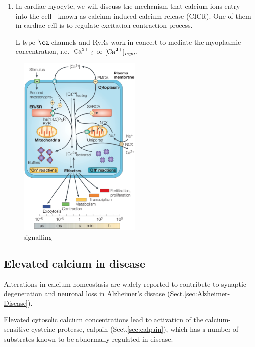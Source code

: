 \begin{enumerate}

  \item  In cardiac myocyte, we will discuss the mechanism that calcium ions
  entry into the cell - known as calcium induced calcium release (CICR). One of
  them in cardiac cell is to regulate excitation-contraction process.

L-type $\ca$ channels and RyRs work in concert to mediate the myoplasmic
 concentration, i.e. $[\ce{Ca^2+}]_i$ or $[\ce{Ca^2+}]_{myo}$.

\end{enumerate}



\begin{figure}[htb]
  \centerline{\includegraphics[height=9cm]{./images/calcium_signalling.eps}}
  \caption{ signalling}\label{fig:Ca_signalling}
\end{figure}







\subsection{Elevated calcium in disease}
\label{sec:calcium-homeostasis-disease}

Alterations in calcium homeostasis are widely reported to contribute to synaptic
degeneration and neuronal loss in Alzheimer's disease
(Sect.\ref{sec:Alzheimer-Disease}).

Elevated cytosolic calcium concentrations lead to activation of the
calcium-sensitive cysteine protease, calpain (Sect.\ref{sec:calpain}), which has
a number of substrates known to be abnormally regulated in disease.


